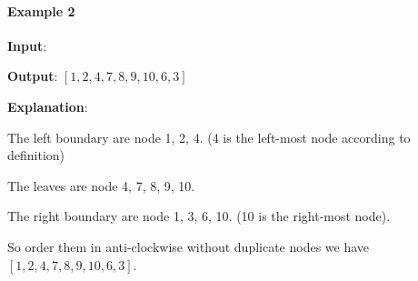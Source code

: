 \paragraph{Example 2}

\begin{flushleft}
\textbf{Input}:
\begin{figure}[H]
\end{figure}
      
\textbf{Output}: $[1,2,4,7,8,9,10,6,3]$

\textbf{Explanation}:

The left boundary are node 1, 2, 4. (4 is the left-most node according to definition)

The leaves are node 4, 7, 8, 9, 10.

The right boundary are node 1, 3, 6, 10. (10 is the right-most node).

So order them in anti-clockwise without duplicate nodes we have $[1,2,4,7,8,9,10,6,3]$.
\end{flushleft}
